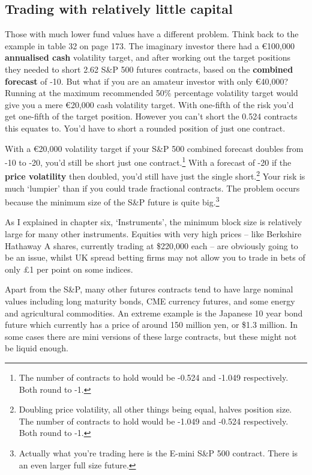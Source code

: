 \subsection*{Trading with relatively little capital}

Those with much lower fund values have a different problem. Think back to the example in table 32 on page 173. The imaginary investor there had a €100,000 \textbf{annualised cash} volatility target, and after working out the target positions they needed to short 2.62 S\&P 500 futures contracts, based on the \textbf{combined forecast} of -10. But what if you are an amateur investor with only €40,000? Running at the maximum recommended 50\% percentage volatility target would give you a mere €20,000 cash volatility target. With one-fifth of the risk you'd get one-fifth of the target position. However you can't short the 0.524 contracts this equates to. You'd have to short a rounded position of just one contract.

With a €20,000 volatility target if your S\&P 500 combined forecast doubles from -10 to -20, you'd still be short just one contract.\footnote{The number of contracts to hold would be -0.524 and -1.049 respectively. Both round to -1.} With a forecast of -20 if the \textbf{price volatility} then doubled, you'd still have just the single short.\footnote{Doubling price volatility, all other things being equal, halves position size. The number of contracts to hold would be -1.049 and -0.524 respectively. Both round to -1.} Your risk is much ‘lumpier' than if you could trade fractional contracts. The problem occurs because the minimum size of the S\&P future is quite big.\footnote{Actually what you're trading here is the E-mini S\&P 500 contract. There is an even larger full size future.}

As I explained in chapter six, ‘Instruments', the minimum block size is relatively large for many other instruments. Equities with very high prices -- like Berkshire Hathaway A shares, currently trading at \$220,000 each -- are obviously going to be an issue, whilst UK spread betting firms may not allow you to trade in bets of only £1 per point on some indices.

Apart from the S\&P, many other futures contracts tend to have large nominal values including long maturity bonds, CME currency futures, and some energy and agricultural commodities. An extreme example is the Japanese 10 year bond future which currently has a price of around 150 million yen, or \$1.3 million. In some cases there are mini versions of these large contracts, but these might not be liquid enough.

